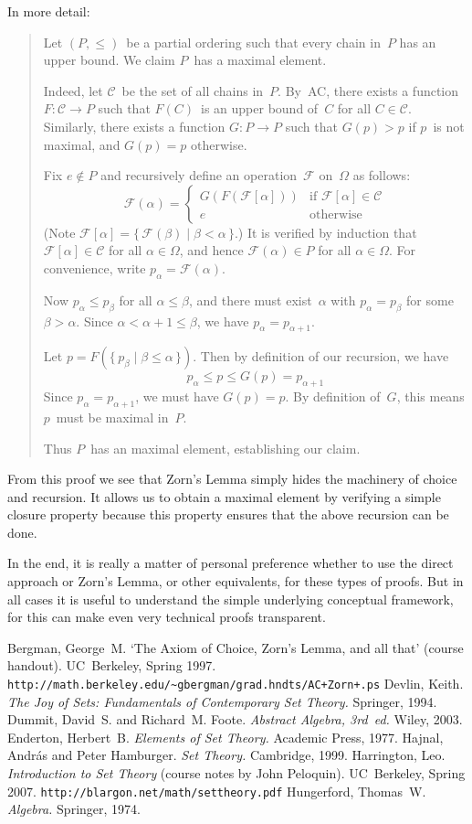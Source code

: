 \documentclass[letterpaper]{article}
\newcommand{\F}{\mathcal{F}}
\newcommand{\C}{\mathcal{C}}
\begin{document}
In more detail:
\begin{quote}
Let $(P,\le)$~be a partial ordering such that every chain in~$P$ has an upper bound. We claim $P$~has a maximal element.

Indeed, let $\C$~be the set of all chains in~$P$. By~AC, there exists a function $F:\C\to P$ such that $F(C)$~is an upper bound of~$C$ for all $C\in\C$. Similarly, there exists a function $G:P\to P$ such that $G(p)>p$ if $p$~is not maximal, and $G(p)=p$ otherwise.

Fix $e\not\in P$ and recursively define an operation~$\F$ on~$\Omega$ as follows:
$$\F(\alpha)=
\begin{cases}
G(F(\F[\alpha]))&\text{if }\F[\alpha]\in\C\\
e&\text{otherwise}
\end{cases}$$
(Note $\F[\alpha]=\{\,\F(\beta)\mid\beta<\alpha\,\}$.) It is verified by induction that $\F[\alpha]\in\C$ for all $\alpha\in\Omega$, and hence $\F(\alpha)\in P$ for all $\alpha\in\Omega$. For convenience, write $p_{\alpha}=\F(\alpha)$.

Now $p_{\alpha}\le p_{\beta}$ for all $\alpha\le\beta$, and there must exist~$\alpha$ with $p_{\alpha}=p_{\beta}$ for some $\beta>\alpha$. Since $\alpha<\alpha+1\le\beta$, we have $p_{\alpha}=p_{\alpha+1}$.

Let $p=F(\{\,p_{\beta}\mid\beta\le\alpha\,\})$. Then by definition of our recursion, we have
$$p_{\alpha}\le p\le G(p)=p_{\alpha+1}$$
Since $p_{\alpha}=p_{\alpha+1}$, we must have $G(p)=p$. By definition of~$G$, this means $p$~must be maximal in~$P$.

Thus $P$~has an maximal element, establishing our claim.
\end{quote}
From this proof we see that Zorn's Lemma simply hides the machinery of choice and recursion. It allows us to obtain a maximal element by verifying a simple closure property because this property ensures that the above recursion can be done.

In the end, it is really a matter of personal preference whether to use the direct approach or Zorn's Lemma, or other equivalents, for these types of proofs. But in all cases it is useful to understand the simple underlying conceptual framework, for this can make even very technical proofs transparent.
\begin{thebibliography}{0}
 Bergman, George~M. `The Axiom of Choice, Zorn's Lemma, and all that' (course handout). UC~Berkeley, Spring 1997.\\
\verb$http://math.berkeley.edu/~gbergman/grad.hndts/AC+Zorn+.ps$
 Devlin, Keith. \emph{The Joy of Sets: Fundamentals of Contemporary Set Theory.} Springer, 1994.
 Dummit, David~S. and Richard~M. Foote. \emph{Abstract Algebra, 3rd~ed.} Wiley, 2003.
 Enderton, Herbert~B. \emph{Elements of Set Theory.} Academic Press, 1977.
 Hajnal, Andr\'as and Peter Hamburger. \emph{Set Theory.} Cambridge, 1999.
 Harrington, Leo. \emph{Introduction to Set Theory} (course notes by John Peloquin). UC~Berkeley, Spring 2007.  \verb$http://blargon.net/math/settheory.pdf$
 Hungerford, Thomas~W. \emph{Algebra.} Springer, 1974.
\end{thebibliography}
\end{document}

